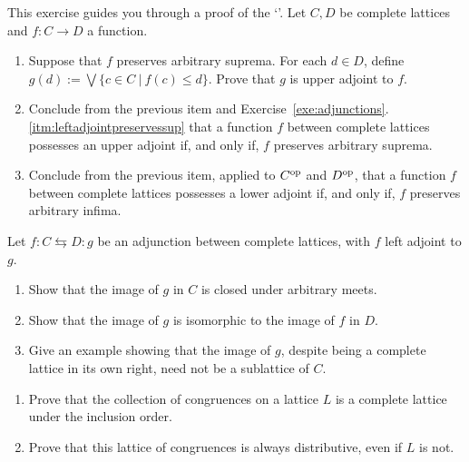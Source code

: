 \begin{exercise}\label{exe:adjointexistsiff}
This exercise guides you through a proof of the `'. Let $C, D$ be complete lattices and $f \colon C \to D$ a function.
\begin{enumerate}
\item Suppose that $f$ preserves arbitrary suprema. For each $d \in D$, define $g(d) := \bigvee \{c \in C \ | \ f(c) \leq d\}$. Prove that $g$ is upper adjoint to $f$.
\item Conclude from the previous item and Exercise~\ref{exe:adjunctions}.\ref{itm:leftadjointpreservessup} that a function $f$ between complete lattices possesses an upper adjoint if, and only if, $f$ preserves arbitrary suprema.
\item Conclude from the previous item, applied to $C^{\mathrm{op}}$ and $D^{\mathrm{op}}$, that a function $f$ between complete lattices possesses a lower adjoint if, and only if, $f$ preserves arbitrary infima.
\end{enumerate}
\end{exercise}
\begin{exercise}\label{exe:adjointsfix}
  Let $f \colon C \leftrightarrows D \colon g$ be an adjunction between complete lattices, with $f$ left adjoint to $g$.
  \begin{enumerate}
  \item Show that the image of $g$ in $C$ is closed under arbitrary meets.
  \item Show that the image of $g$ is isomorphic to the image of $f$ in $D$.
  \item Give an example showing that the image of $g$, despite being a complete lattice in its own right, need not be a sublattice of $C$.
 \end{enumerate}
\end{exercise}

\begin{exercise}\label{exe:congruencelattice}
\begin{enumerate}
  \item Prove that the collection of congruences on a lattice $L$ is a complete lattice under the inclusion order.
  \item Prove that this lattice of congruences is always distributive, even if $L$ is not.
\end{enumerate}
\end{exercise}


